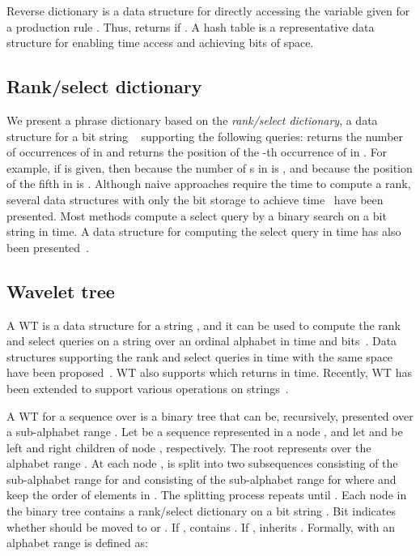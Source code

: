 \documentclass[10pt]{llncs}
\begin{document}
Reverse dictionary  is a data structure for directly accessing the variable  
given  for a production rule . 
Thus,  returns  if .
A hash table is a representative data structure for  enabling  time access 
and achieving  bits of space. 

\subsection{Rank/select dictionary}
We present a phrase dictionary based on the {\em rank/select dictionary}, 
a data structure for a bit string ~\cite{Jacobson89} supporting the following queries:
 returns the number of occurrences of  in  and 
 returns the position of the -th occurrence of  in .
For example, if  is given, then  because the number of s in 
 is ,
and  because the position of the fifth  in  is .
Although naive approaches require the  time to compute a rank, 
several data structures with only the  bit storage to 
achieve  time~\cite{Navarro12,Okanohara07} have been presented. 
Most methods compute a select query by a binary search on a bit string  in  time. 
A data structure for computing the select query in  time has also been presented~\cite{Ram02}.

\subsection{Wavelet tree}
A WT is a data structure for a string , and 
it can be used to compute the rank and select queries on a string  over an ordinal alphabet 
in  time and  bits~\cite{Grossi03}.
Data structures supporting the rank and select queries in  time 
with the same space have been proposed~\cite{Golynski2006,Jeremy2010}. 
WT also supports  which returns  in  time.
Recently, WT has been extended to support various operations on strings~\cite{Navarro2012-cpm}.

A WT for a sequence  over  is a binary tree that 
can be, recursively, presented over a sub-alphabet range . 
Let  be a sequence represented in a node , and let 
 and  be left and right children of node , respectively. 
The root  represents  over the alphabet range .
At each node ,  is split into two subsequences  consisting of 
the sub-alphabet range  for  
and  consisting of the sub-alphabet range  
for  where  and  keep the order of elements in . 
The splitting process repeats until . 
Each node  in the binary tree contains a rank/select dictionary on a bit string . 
Bit  indicates whether  should be moved to  or . 
If ,  contains . 
If ,  inherits . 
Formally,  with an alphabet range  is defined as:
\end{document}
